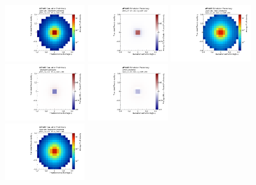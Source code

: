 \begin{figure}[h!]
\begin{center}
\includegraphics[width=0.31\textwidth]{figures/CNN/quark_cluster.pdf}
\includegraphics[width=0.31\textwidth]{figures/CNN/diff_quark_cluster_tower.pdf}
\includegraphics[width=0.31\textwidth]{figures/CNN/quark_tower.pdf}\\
\includegraphics[width=0.31\textwidth]{figures/CNN/diff_cluster.pdf}\hspace{54mm}
\includegraphics[width=0.31\textwidth]{figures/CNN/diff_tower.pdf}\\
\includegraphics[width=0.31\textwidth]{figures/CNN/gluon_cluster.pdf}

\end{center}
\end{figure}
